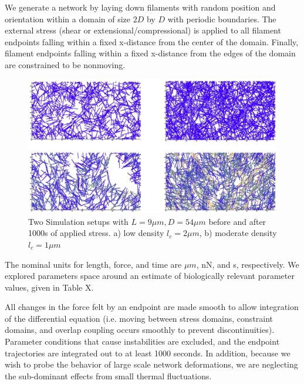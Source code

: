 \documentclass[pre,preprint]{revtex4-1}
\begin{document}
We generate a network by laying down filaments with random position and orientation within a domain of size $2D$ by $D$ with periodic boundaries.  The external stress (shear or extensional/compressional) is applied to all filament endpoints falling within a fixed x-distance from the center of the domain.  Finally, filament endpoints falling within a fixed x-distance from the edges of the domain are constrained to be nonmoving.

\begin{figure}[h!]
\centering
\includegraphics[width=\hsize]{network_def}
\caption{\label{fig:sim}Two Simulation setups with $L=9 \mu m, D = 54 \mu m$ before and after 1000s of applied stress. a) low density $l_c=2 \mu m$, b) moderate density $l_c=1 \mu m$ }
\end{figure}

The nominal units for length, force, and time are $\mu m$, nN, and s, respectively.  We explored parameters space around an estimate of biologically relevant parameter values, given in Table X. 

All changes in the force felt by an endpoint are made smooth to allow integration of the differential equation (i.e. moving between stress domains, constraint domains, and overlap coupling occurs smoothly to prevent discontinuities).  Parameter conditions that cause instabilities are excluded, and the endpoint trajectories are integrated out to at least 1000 seconds. In addition, because we wish to probe the behavior of large scale network deformations, we are neglecting the sub-dominant effects from small thermal fluctuations. 
\end{document}
